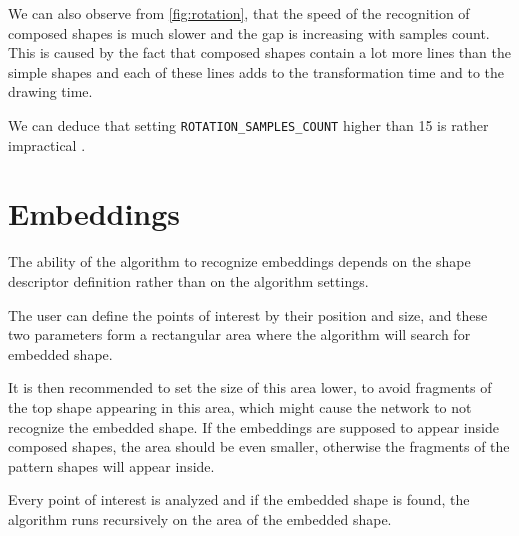 We can also observe from \cref{fig:rotation}, that the speed of the recognition of composed shapes is much slower and the gap  is increasing with samples count. This is caused by the fact that composed shapes contain a lot more lines than the simple shapes and each of these lines adds to the transformation time and to the drawing time.

We can deduce that setting \texttt{ROTATION\_SAMPLES\_COUNT} higher than 15 is rather impractical .


\section{Embeddings}
The ability of the algorithm to recognize embeddings depends  on the shape descriptor definition rather than on the algorithm settings. 

The  user can define the points of interest by their position and size, and these two parameters form a rectangular area where the algorithm will search for embedded shape. 

It is then recommended to set the size of this area lower, to avoid fragments of the top shape appearing in this area, which might cause the network to not recognize the embedded shape. If the embeddings are supposed to appear inside composed shapes, the area should be even smaller, otherwise the fragments of the pattern shapes will appear inside. 

 Every point of interest is analyzed and if the embedded shape is found, the algorithm runs recursively on the area of the embedded shape.


